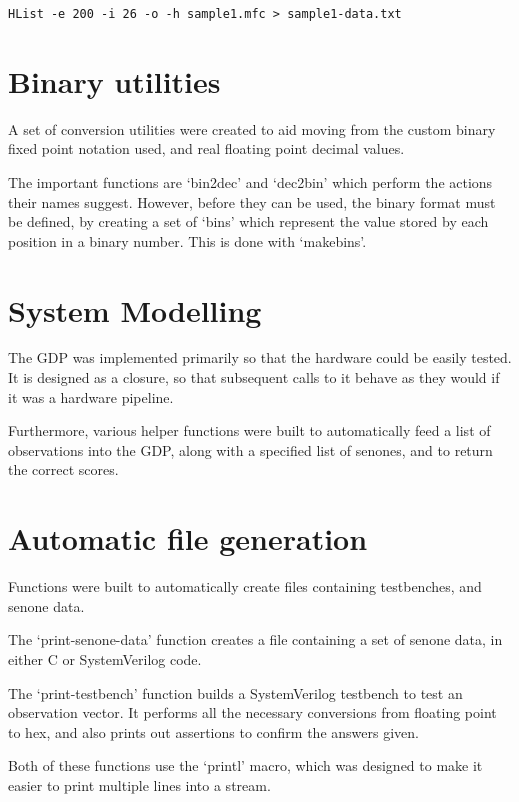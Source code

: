 	\texttt{HList -e 200 -i 26 -o -h sample1.mfc > sample1-data.txt}


\section{Binary utilities} %
\label{apdx:binary_utilities}
	A set of conversion utilities were created to aid moving from the custom binary fixed point notation used, and real floating point decimal values.

	The important functions are `bin2dec' and `dec2bin' which perform the actions their names suggest.  However, before they can be used, the binary format must be defined, by creating a set of `bins' which represent the value stored by each position in a binary number.  This is done with `makebins'.


\section{System Modelling} %
\label{apdx:system_modelling}
	The GDP was implemented primarily so that the hardware could be easily tested.  It is designed as a closure, so that subsequent calls to it behave as they would if it was a hardware pipeline.

	Furthermore, various helper functions were built to automatically feed a list of observations into the GDP, along with a specified list of senones, and to return the correct scores.


\section{Automatic file generation} %
\label{apdx:testbenches}
	Functions were built to automatically create files containing testbenches, and senone data.  

	The `print-senone-data' function creates a file containing a set of senone data, in either C or SystemVerilog code.

	The `print-testbench' function builds a SystemVerilog testbench to test an observation vector.  It performs all the necessary conversions from floating point to hex, and also prints out assertions to confirm the answers given.

	Both of these functions use the `printl' macro, which was designed to make it easier to print multiple lines into a stream.


